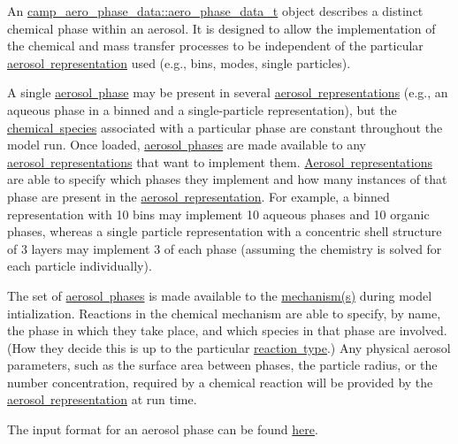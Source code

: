 An {\ttfamily \mbox{\hyperlink{structcamp__aero__phase__data_1_1aero__phase__data__t}{camp\+\_\+aero\+\_\+phase\+\_\+data\+::aero\+\_\+phase\+\_\+data\+\_\+t}}} object describes a distinct chemical phase within an aerosol. It is designed to allow the implementation of the chemical and mass transfer processes to be independent of the particular \mbox{\hyperlink{camp_aero_rep}{aerosol representation}} used (e.\+g., bins, modes, single particles).

A single \mbox{\hyperlink{camp_aero_phase}{aerosol phase}} may be present in several \mbox{\hyperlink{camp_aero_rep}{aerosol representations}} (e.\+g., an aqueous phase in a binned and a single-\/particle representation), but the \mbox{\hyperlink{camp_species}{chemical species}} associated with a particular phase are constant throughout the model run. Once loaded, \mbox{\hyperlink{camp_aero_phase}{aerosol phases}} are made available to any \mbox{\hyperlink{input_format_aero_rep}{aerosol representations}} that want to implement them. \mbox{\hyperlink{camp_aero_rep}{Aerosol representations}} are able to specify which phases they implement and how many instances of that phase are present in the \mbox{\hyperlink{camp_aero_rep}{aerosol representation}}. For example, a binned representation with 10 bins may implement 10 aqueous phases and 10 organic phases, whereas a single particle representation with a concentric shell structure of 3 layers may implement 3 of each phase (assuming the chemistry is solved for each particle individually).

The set of \mbox{\hyperlink{camp_aero_phase}{aerosol phases}} is made available to the \mbox{\hyperlink{camp_mechanism}{mechanism(s)}} during model intialization. Reactions in the chemical mechanism are able to specify, by name, the phase in which they take place, and which species in that phase are involved. (How they decide this is up to the particular \mbox{\hyperlink{camp_rxn}{reaction type}}.) Any physical aerosol parameters, such as the surface area between phases, the particle radius, or the number concentration, required by a chemical reaction will be provided by the \mbox{\hyperlink{camp_aero_rep}{aerosol representation}} at run time.

The input format for an aerosol phase can be found \mbox{\hyperlink{input_format_aero_phase}{here}}. 